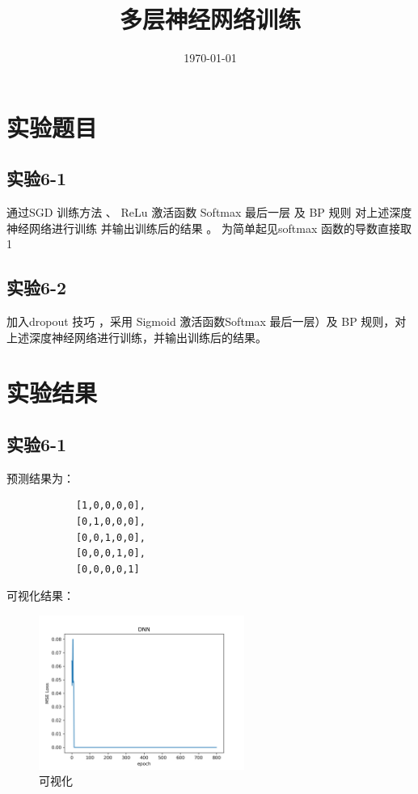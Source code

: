 \documentclass{../source/Experiment}
\title{多层神经网络训练}
\date{\today}
\begin{document}
    \makecover
    \section{实验题目}
        \subsection{实验6-1}
        通过SGD 训练方法 、 ReLu 激活函数 Softmax 最后一层 及 BP 规则 对上述深度神经网络进行训练 并输出训练后的结果 。 为简单起见softmax 函数的导数直接取 1        
        \subsection{实验6-2}
                加入dropout 技巧 ，采用 Sigmoid 激活函数Softmax 最后一层）及 BP 规则，对 上述深度神经网络进行训练，并输出训练后的结果。
    \section{实验结果}
        \subsection{实验6-1}
            预测结果为：
            \begin{lstlisting}
            [1,0,0,0,0],
            [0,1,0,0,0],
            [0,0,1,0,0],
            [0,0,0,1,0],
            [0,0,0,0,1]
            \end{lstlisting}
            可视化结果：
            \begin{figure}[H]
                \centering
                \includegraphics[width = 0.6\textwidth]{Part6/6_1.png}
                \caption{可视化}
            \end{figure}
\end{document}
